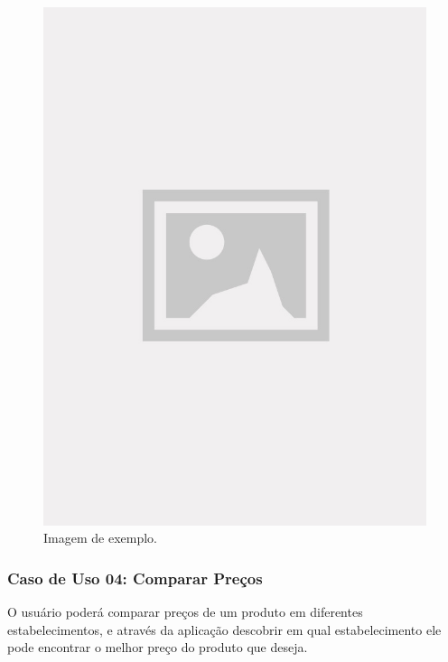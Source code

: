 \begin{figure}[!htb]
\centering
\caption{Imagem de exemplo.}
\includegraphics[width=\linewidth]{figuras/placeholder.jpg}
\end{figure}

\subsubsection{Caso de Uso 04: Comparar Preços}

O usuário poderá comparar preços de um produto em diferentes estabelecimentos, e através da aplicação descobrir em qual estabelecimento ele pode encontrar o melhor preço do produto que deseja.

